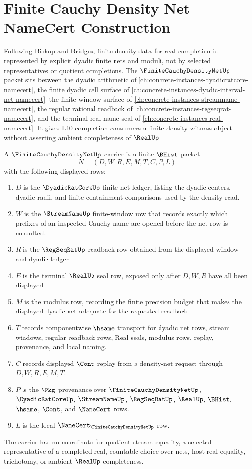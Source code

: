 \chapter{Finite Cauchy Density Net NameCert Construction}
\label{ch:concrete-instances-finite-cauchy-density-net-namecert}

Following Bishop and Bridges, finite density data for real completion is represented by explicit dyadic finite nets and moduli, not by selected representatives or quotient completions. The $\FiniteCauchyDensityNetUp$ packet sits between the dyadic arithmetic of \autoref{ch:concrete-instances-dyadicratcore-namecert}, the finite dyadic cell surface of \autoref{ch:concrete-instances-dyadic-interval-net-namecert}, the finite window surface of \autoref{ch:concrete-instances-streamname-namecert}, the regular rational readback of \autoref{ch:concrete-instances-regseqrat-namecert}, and the terminal real-name seal of \autoref{ch:concrete-instances-real-namecert}. It gives L10 completion consumers a finite density witness object without asserting ambient completeness of $\RealUp$.

\begin{definition}
\label{def:finite-cauchy-density-net-packet}
A $\FiniteCauchyDensityNetUp$ carrier is a finite $\BHist$ packet
$$
N=(D,W,R,E,M,T,C,P,L)
$$
with the following displayed rows:
\begin{enumerate}
\item $D$ is the $\DyadicRatCoreUp$ finite-net ledger, listing the dyadic centers, dyadic radii, and finite containment comparisons used by the density read.
\item $W$ is the $\StreamNameUp$ finite-window row that records exactly which prefixes of an inspected Cauchy name are opened before the net row is consulted.
\item $R$ is the $\RegSeqRatUp$ readback row obtained from the displayed window and dyadic ledger.
\item $E$ is the terminal $\RealUp$ seal row, exposed only after $D,W,R$ have all been displayed.
\item $M$ is the modulus row, recording the finite precision budget that makes the displayed dyadic net adequate for the requested readback.
\item $T$ records componentwise $\hsame$ transport for dyadic net rows, stream windows, regular readback rows, Real seals, modulus rows, replay, provenance, and local naming.
\item $C$ records displayed $\Cont$ replay from a density-net request through $D,W,R,E,M,T$.
\item $P$ is the $\Pkg$ provenance over $\FiniteCauchyDensityNetUp$, $\DyadicRatCoreUp$, $\StreamNameUp$, $\RegSeqRatUp$, $\RealUp$, $\BHist$, $\hsame$, $\Cont$, and $\NameCert$ rows.
\item $L$ is the local $\NameCert_{\FiniteCauchyDensityNetUp}$ row.
\end{enumerate}
The carrier has no coordinate for quotient stream equality, a selected representative of a completed real, countable choice over nets, host real equality, trichotomy, or ambient $\RealUp$ completeness.
\end{definition}

